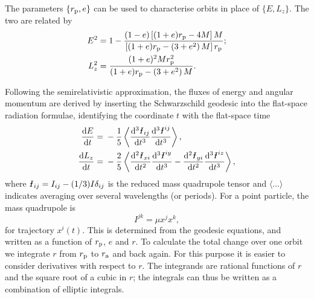The parameters $\{r_\mathrm{p},e\}$ can be used to characterise orbits in place of $\{E,L_z\}$. The two are related by
\begin{align}
E^2 = {} & 1 - \frac{(1 - e) \left[(1 + e)r_\mathrm{p} - 4M\right]M}{\left[(1 + e)r_\mathrm{p} - \left(3 + e^2\right)M\right]r_\mathrm{p}}; \\
L_z^2 = {} & \frac{(1 + e)^2 M r_\mathrm{p}^2}{(1 + e)r_\mathrm{p} - \left(3 + e^2\right)M}.
\end{align}

Following the semirelativistic approximation, the fluxes of energy and angular momentum are derived by inserting the Schwarzschild geodesic into the flat-space radiation formulae, identifying the coordinate $t$ with the flat-space time \citep[chapter 36]{Misner1973}
\begin{align}
\diff{E}{t} = {} & -\recip{5}\left\langle \diffn{\Ibar_{ij}}{t}{3}\diffn{\Ibar^{ij}}{t}{3}\right\rangle,\\
\diff{L_z}{t} = {} & -\frac{2}{5}\left\langle\diffn{\Ibar_{xi}}{t}{2}\diffn{\Ibar^{iy}}{t}{3} - \diffn{\Ibar_{yi}}{t}{2}\diffn{\Ibar^{iz}}{t}{3}\right\rangle,
\end{align}
where $\Ibar_{ij} = I_{ij} - (1/3)I\delta_{ij}$ is the reduced mass quadrupole tensor and $\langle\ldots\rangle$ indicates averaging over several wavelengths (or periods). For a point particle, the mass quadrupole is
\begin{equation}
{I}^{jk} = \mu x^j x^k,
\end{equation}
for trajectory $x^i(t)$. This is determined from the geodesic equations, and written as a function of $r_\mathrm{p}$, $e$ and $r$. To calculate the total change over one orbit we integrate $r$ from $r_\mathrm{p}$ to $r_\mathrm{a}$ and back again. For this purpose it is easier to consider derivatives with respect to $r$. The integrands are rational functions of $r$ and the square root of a cubic in $r$; the integrals can thus be written as a combination of elliptic integrals.

